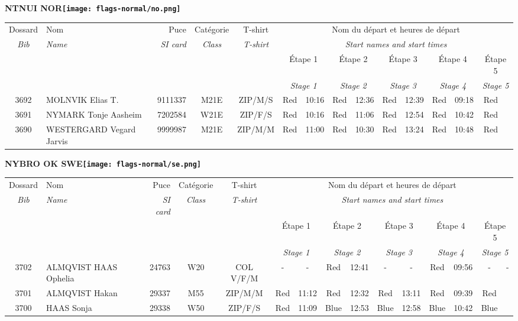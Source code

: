 \documentclass{report}
\begin{document}
\newpage
  \Huge \centering \bfseries NTNUI  NOR\normalfont \footnotesize \sffamily \hfill \texttt{[image: flags-normal/no.png]} \newline 
  \begin{longtable}{|c|l|r|c|c|*{5}{cc|}}
    Dossard & Nom  & Puce    & Catégorie & T-shirt & \multicolumn{10}{c|}{Nom du départ et heures de départ} \\
    \itshape Bib     & \itshape Name & \itshape SI card & \itshape Class  & \itshape  T-shirt  & \multicolumn{10}{c|}{\itshape Start names and start times} \\
    \hline
    & & & & & \multicolumn{2}{c|}{Étape 1} & \multicolumn{2}{c|}{Étape 2} & \multicolumn{2}{c|}{Étape 3} & \multicolumn{2}{c|}{Étape 4} & \multicolumn{2}{c|}{Étape 5} \\
    & & & & & \multicolumn{2}{c|}{\itshape Stage 1} & \multicolumn{2}{c|}{\itshape Stage 2} & \multicolumn{2}{c|}{\itshape Stage 3} & \multicolumn{2}{c|}{\itshape Stage 4} & \multicolumn{2}{c|}{\itshape Stage 5} \\
    \hline
    3692 & MOLNVIK Elias T. & 9111337 & M21E & ZIP/M/S & Red & 10:16 & Red & 12:36 & Red & 12:39 & Red & 09:18 & Red &  \\
    3691 & NYMARK Tonje Aasheim & 7202584 & W21E & ZIP/F/S & Red & 10:16 & Red & 11:06 & Red & 12:54 & Red & 10:42 & Red &  \\
    3690 & WESTERGARD Vegard Jarvis & 9999987 & M21E & ZIP/M/M & Red & 11:00 & Red & 10:30 & Red & 13:24 & Red & 10:48 & Red &  \\
  \end{longtable}
\newpage
  \Huge \centering \bfseries NYBRO OK  SWE\normalfont \footnotesize \sffamily \hfill \texttt{[image: flags-normal/se.png]} \newline 
  \begin{longtable}{|c|l|r|c|c|*{5}{cc|}}
    Dossard & Nom  & Puce    & Catégorie & T-shirt & \multicolumn{10}{c|}{Nom du départ et heures de départ} \\
    \itshape Bib     & \itshape Name & \itshape SI card & \itshape Class  & \itshape  T-shirt  & \multicolumn{10}{c|}{\itshape Start names and start times} \\
    \hline
    & & & & & \multicolumn{2}{c|}{Étape 1} & \multicolumn{2}{c|}{Étape 2} & \multicolumn{2}{c|}{Étape 3} & \multicolumn{2}{c|}{Étape 4} & \multicolumn{2}{c|}{Étape 5} \\
    & & & & & \multicolumn{2}{c|}{\itshape Stage 1} & \multicolumn{2}{c|}{\itshape Stage 2} & \multicolumn{2}{c|}{\itshape Stage 3} & \multicolumn{2}{c|}{\itshape Stage 4} & \multicolumn{2}{c|}{\itshape Stage 5} \\
    \hline
    3702 & ALMQVIST HAAS Ophelia & 24763 & W20 & COL V/F/M & - &  - & Red & 12:41 & - &  - & Red & 09:56 & - &  -\\
    3701 & ALMQVIST Hakan & 29337 & M55 & ZIP/M/M & Red & 11:12 & Red & 12:32 & Red & 13:11 & Red & 09:39 & Red &  \\
    3700 & HAAS Sonja & 29338 & W50 & ZIP/F/S & Red & 11:09 & Blue & 12:53 & Blue & 12:58 & Blue & 10:42 & Blue &  \\
  \end{longtable}
\end{document}
